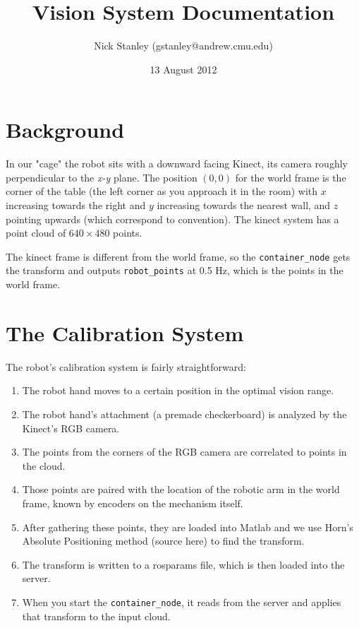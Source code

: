 \documentclass{article}
\begin{document}
\title{Vision System Documentation}
\author{Nick Stanley (gstanley@andrew.cmu.edu)}
\date{13 August 2012}
\maketitle

\section{Background}
In our "cage" the robot sits with a downward facing Kinect, its camera roughly perpendicular to the \emph{x-y} plane. The position $(0,0)$ for the world frame is the corner of the table (the left corner as you approach it in the room) with $x$ increasing towards the right and $y$ increasing towards the nearest wall, and $z$ pointing upwards (which correspond to convention). The kinect system has a point cloud of $640 \times 480$ points.

 The kinect frame is different from the world frame, so the \texttt{container\_node} gets the transform and outputs \texttt{robot\_points} at 0.5 Hz, which is the points in the world frame.

\section{The Calibration System}

The robot's calibration system is fairly straightforward:

\begin{enumerate}
	\item The robot hand moves to a certain position in the optimal vision range. 
	\item The robot hand's attachment (a premade checkerboard) is analyzed by the Kinect's RGB camera.
	\item The points from the corners of the RGB camera are correlated to points in the cloud.
	\item Those points are paired with the location of the robotic arm in the world frame, known by encoders on the mechanism itself. 
	\item After gathering these points, they are loaded into Matlab and we use Horn's Absolute Positioning method (source here) to find the transform. 
	\item The transform is written to a rosparams file, which is then loaded into the server. 
	\item When you start the \texttt{container\_node}, it reads from the server and applies that transform to the input cloud.
\end{enumerate}
\end{document}
